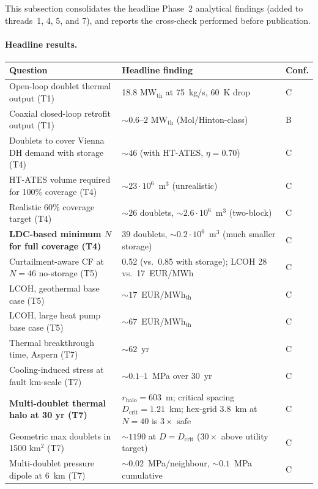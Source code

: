 \documentclass{article}
\begin{document}
This subsection consolidates the headline Phase~2 analytical
findings (added to threads~1, 4, 5, and 7), and reports the
cross-check performed before publication.

\paragraph{Headline results.}
\begin{center}
\begin{tabular}{lll}
\hline
\textbf{Question} & \textbf{Headline finding} & \textbf{Conf.} \\
\hline
Open-loop doublet thermal output (T1)         & 18.8 MW$_{\mathrm{th}}$ at 75~kg/s, 60~K drop & C \\
Coaxial closed-loop retrofit output (T1)       & $\sim 0.6$--$2$ MW$_{\mathrm{th}}$ (Mol/Hinton-class) & B \\
Doublets to cover Vienna DH demand with storage (T4) & $\sim 46$ (with HT-ATES, $\eta=0.70$) & C \\
HT-ATES volume required for 100\% coverage (T4) & $\sim 23 \cdot 10^{6}$~m$^3$ (unrealistic) & C \\
Realistic 60\% coverage target (T4)            & $\sim 26$ doublets, $\sim 2.6 \cdot 10^{6}$~m$^3$ (two-block) & C \\
\textbf{LDC-based minimum $N$ for full coverage (T4)} & 39 doublets, $\sim 0.2 \cdot 10^{6}$~m$^3$ (much smaller storage) & C \\
Curtailment-aware CF at $N=46$ no-storage (T5)  & 0.52 (vs.\ 0.85 with storage); LCOH 28 vs.\ 17~EUR/MWh & C \\
LCOH, geothermal base case (T5)                 & $\sim 17$~EUR/MWh$_{\mathrm{th}}$ & C \\
LCOH, large heat pump base case (T5)            & $\sim 67$~EUR/MWh$_{\mathrm{th}}$ & C \\
Thermal breakthrough time, Aspern (T7)          & $\sim 62$~yr & C \\
Cooling-induced stress at fault km-scale (T7)   & $\sim 0.1$--$1$~MPa over 30~yr & C \\
\textbf{Multi-doublet thermal halo at 30 yr (T7)} & $r_{\mathrm{halo}}=603$~m; critical spacing $D_{\mathrm{crit}}=1.21$~km; hex-grid 3.8~km at $N=40$ is $3\times$ safe & C \\
Geometric max doublets in 1500 km$^2$ (T7)       & $\sim 1190$ at $D=D_{\mathrm{crit}}$ ($30\times$ above utility target) & C \\
Multi-doublet pressure dipole at 6~km (T7)       & $\sim 0.02$~MPa/neighbour, $\sim 0.1$~MPa cumulative & C \\

\end{tabular}
\end{center}
\end{document}
